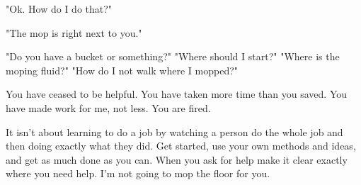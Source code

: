 \documentclass[12pt]{article}
\begin{document}
"Ok. How do I do that?"

"The mop is right next to you."

"Do you have a bucket or something?"
"Where should I start?" "Where is the moping fluid?" "How do I not walk where I mopped?"

You have ceased to be helpful. You have taken more time than you saved. You have made work for me, not less. You are fired. 

It isn't about learning to do a job by watching a person do the whole job and then doing exactly what they did. Get started, use your own methods and ideas, and get as much done as you can. When you ask for help make it clear exactly where you need help. I'm not going to mop the floor for you. 









%
%
%
\end{document}
